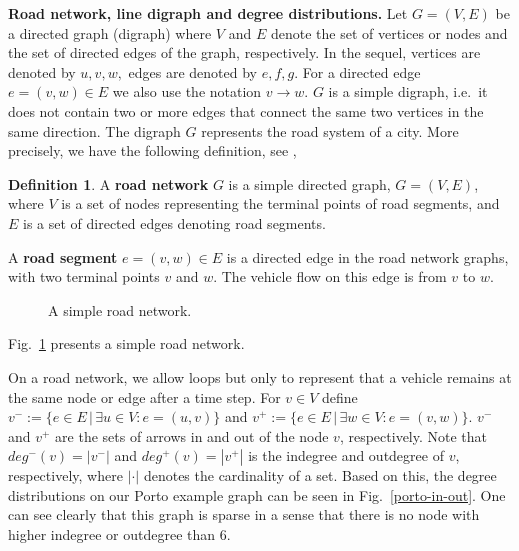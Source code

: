 \documentclass[b5paper,12pt]{report}
\theoremstyle{definition}
\newtheorem{definition}{Definition}
\begin{document}
\smallskip

\textbf{Road network, line digraph and degree distributions.} Let $G = (V,E)$ be a directed graph (digraph) where $V$ and $E$ denote the set of vertices or nodes and the set of directed edges of the graph, respectively. In the sequel, vertices are denoted by $u, v, w,$ edges are denoted by $e, f, g$. For a directed edge $e = (v,w) \in E$ we also use the notation $v \rightarrow w$. $G$ is a simple digraph, i.e.~it does not contain two or more edges that connect the same two vertices in the same direction. The digraph $G$ represents the road system of a city. More precisely, we have the following definition, see \cite{pan2013crowd}, 
\begin{definition}
A \textbf{road network} $G$ is a simple directed graph, $G = (V,E)$, where $V$ is a set of nodes representing the terminal points of road segments, and $E$ is a set of directed edges denoting road segments.

A \textbf{road segment} $e = (v,w) \in E$ is a directed edge in the road network graphs, with two terminal points $v$ and $w$. The vehicle flow on this edge is from $v$ to $w$.
\end{definition}

\begin{figure}[b!]
\centering
{}
\caption{A simple road network.}
\label{graph-example-1}
\end{figure}
Fig.~\ref{graph-example-1} presents a simple road network.

On a road network, we allow loops but only to represent that a vehicle remains at the same node or edge after a time step. For $v \in V$ define $v^{−} := \{e \in E\, |\, \exists u \in V : e = (u, v)\}$ and $v^{+} := \{e \in E \,|\, \exists w \in V : e = (v, w)\}$. $v^{−}$ and $v^{+}$ are the sets of arrows in and out of the node $v$, respectively. Note that $deg^{−}(v) = |v^{−}|$ and $deg^{+}(v) = |v^{+}|$ is the indegree and outdegree of $v$, respectively, where $|\cdot|$ denotes the cardinality of a set. Based on this, the degree distributions on our Porto example graph can be seen in Fig.~\ref{porto-in-out}. One can see clearly that this graph is sparse in a sense that there is no node with higher indegree or outdegree than 6.
\end{document}
